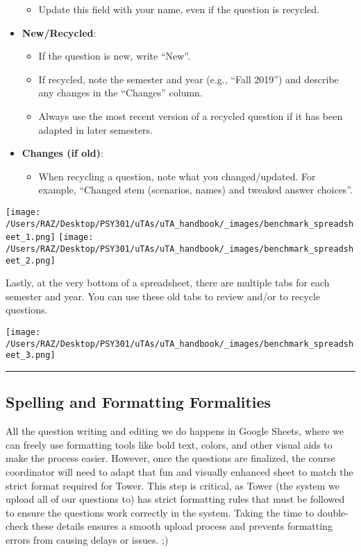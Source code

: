 \documentclass[
]{article}
\providecommand{\tightlist}{%
  \setlength{\itemsep}{0pt}\setlength{\parskip}{0pt}}
\begin{document}
\begin{itemize}
  \begin{itemize}
  \tightlist
  \item
    Update this field with your name, even if the question is recycled.
  \end{itemize}
\item
  \textbf{New/Recycled}:

  \begin{itemize}
  \tightlist
  \item
    If the question is new, write ``New''.\\
  \item
    If recycled, note the semester and year (e.g., ``Fall 2019'') and describe any changes in the ``Changes'' column.
  \item
    Always use the most recent version of a recycled question if it has been adapted in later semesters.
  \end{itemize}
\item
  \textbf{Changes (if old)}:

  \begin{itemize}
  \tightlist
  \item
    When recycling a question, note what you changed/updated. For example, ``Changed stem (scenarios, names) and tweaked answer choices''.
  \end{itemize}
\end{itemize}

\texttt{[image: /Users/RAZ/Desktop/PSY301/uTAs/uTA\_handbook/\_images/benchmark\_spreadsheet\_1.png]}
\texttt{[image: /Users/RAZ/Desktop/PSY301/uTAs/uTA\_handbook/\_images/benchmark\_spreadsheet\_2.png]}

Lastly, at the very bottom of a spreadsheet, there are multiple tabs for each semester and year. You can use these old tabs to review and/or to recycle questions.

\texttt{[image: /Users/RAZ/Desktop/PSY301/uTAs/uTA\_handbook/\_images/benchmark\_spreadsheet\_3.png]}

\begin{center}\rule{0.5\linewidth}{0.5pt}\end{center}

\hypertarget{spelling-and-formatting-formalities}{%
\subsection{Spelling and Formatting Formalities}\label{spelling-and-formatting-formalities}}

All the question writing and editing we do happens in Google Sheets, where we can freely use formatting tools like bold text, colors, and other visual aids to make the process easier. However, once the questions are finalized, the course coordinator will need to adapt that fun and visually enhanced sheet to match the strict format required for Tower. This step is critical, as Tower (the system we upload all of our questions to) has strict formatting rules that must be followed to ensure the questions work correctly in the system. Taking the time to double-check these details ensures a smooth upload process and prevents formatting errors from causing delays or issues. ;)
\end{document}
